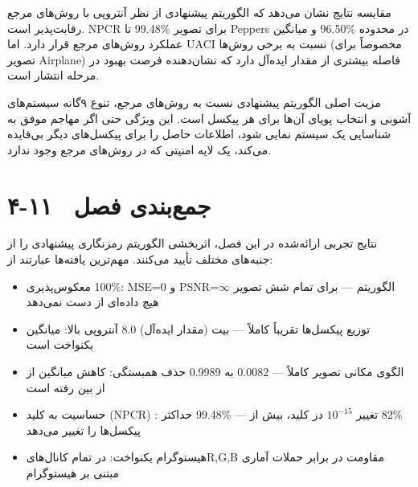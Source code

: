 مقایسه نتایج نشان می‌دهد که الگوریتم پیشنهادی از نظر آنتروپی با روش‌های مرجع رقابت‌پذیر است.    ‎NPCR‎ تا ‎‎99.48\%‎‎ برای تصویر ‎Peppers‎ و میانگین ‎‎96.50\%‎ در محدوده عملکرد روش‌های مرجع قرار دارد. اما ‎UACI‎ نسبت به برخی روش‌ها (مخصوصاً برای تصویر ‎Airplane‎) فاصله بیشتری از مقدار ایده‌آل دارد که نشان‌دهنده فرصت بهبود در مرحله انتشار است.

مزیت اصلی الگوریتم پیشنهادی نسبت به روش‌های مرجع، تنوع ۹گانه سیستم‌های آشوبی و انتخاب پویای آن‌ها برای هر پیکسل است. این ویژگی حتی اگر مهاجم موفق به شناسایی یک سیستم نمایی شود، اطلاعات حاصل را برای پیکسل‌های دیگر بی‌فایده می‌کند، یک لایه امنیتی که در روش‌های مرجع وجود ندارد.

\section{۴-۱۱  جمع‌بندی فصل}

نتایج تجربی ارائه‌شده در این فصل، اثربخشی الگوریتم رمزنگاری پیشنهادی را از جنبه‌های مختلف تأیید می‌کنند. مهم‌ترین یافته‌ها عبارتند از:

\begin{itemize}
    \item معکوس‌پذیری ‎100\%‎:  ‎MSE=0‎ و ‎PSNR‎=$\infty$ برای تمام شش تصویر ‎---‎ الگوریتم هیچ داده‌ای از دست نمی‌دهد
\end{itemize}

\begin{itemize}
    \item آنتروپی بالا:  میانگین ‎8.0‎ بیت (مقدار ایده‌آل) ‎---‎ توزیع پیکسل‌ها تقریباً کاملاً یکنواخت است
\end{itemize}

\begin{itemize}
    \item حذف همبستگی: کاهش میانگین از ‎0.9989‎ به ‎0.0082‎ ‎---‎ الگوی مکانی تصویر کاملاً از بین رفته است
\end{itemize}

\begin{itemize}
    \item حساسیت به کلید (‎NPCR‎) : حداکثر ‎99.48\%‎ ‎---‎ تغییر $10^{-15}$ در کلید، بیش از ‎‎82\%‎‎ پیکسل‌ها را تغییر می‌دهد
\end{itemize}

\begin{itemize}
    \item هیستوگرام یکنواخت:  در تمام کانال‌های‎R‎,‎G‎,‎B‎   مقاومت در برابر حملات آماری مبتنی بر هیستوگرام
\end{itemize}

